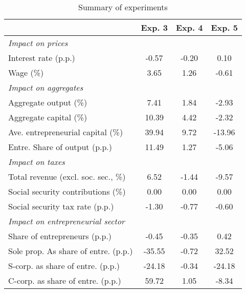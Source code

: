 \documentclass[11pt,english]{article}
\begin{document}
\begin{table}[htbp]
	\centering
	\begin{tabular}{lccc}
		\toprule
		& Exp. 3 & Exp. 4 & Exp. 5\\
		\hline
		\multicolumn{4}{l}{\textit{Impact on prices}} \\
		Interest rate (p.p.) & -0.57 & -0.20 & 0.10 \\
		Wage (\%) & 3.65 & 1.26 & -0.61 \\
		\multicolumn{4}{l}{\textit{Impact on aggregates}} \\
		Aggregate output (\%) & 7.41 & 1.84 & -2.93 \\
		Aggregate capital (\%) & 10.39 & 4.42 & -2.32 \\
		Ave. entrepreneurial capital (\%) & 39.94 & 9.72 & -13.96 \\
		Entre. Share of output (p.p.) & 11.49 & 1.27 & -5.06 \\
		\multicolumn{4}{l}{\textit{Impact on taxes}} \\
		Total revenue (excl. soc. sec., \%) & 6.52 & -1.44 & -9.57 \\
		Social security contributions (\%) & 0.00 & 0.00 & 0.00 \\
		Social security tax rate (p.p.) & -1.30 & -0.77 & -0.60 \\
		\multicolumn{4}{l}{\textit{Impact on entrepreneurial sector}} \\
		Share of entrepreneurs (p.p.) & -0.45 & -0.35 & 0.42 \\
		Sole prop. As share of entre. (p.p.) & -35.55 & -0.72 & 32.52 \\
		S-corp. as share of entre. (p.p.) & -24.18 & -0.34 & -24.18 \\
		C-corp. as share of entre. (p.p.) & 59.72 & 1.05 & -8.34 \\
		\bottomrule	
		\end{tabular}%
	\caption{Summary of experiments}
	\label{tab:exp_summary}%

\end{table}%
\end{document}
